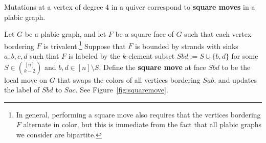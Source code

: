 Mutations at a vertex of degree 4 in a quiver correspond to \textbf{square moves} in a plabic graph.
\begin{defi}\label{definition:squaremove}
Let $G$ be a plabic graph, and let $F$ be a square face of $G$ such that each vertex bordering $F$ is trivalent.\footnote{In general, performing a square move also requires that the vertices bordering $F$ alternate in color, but this is immediate from the fact that all plabic graphs we consider are bipartite.} Suppose that $F$ is bounded by strands with sinks $a,b,c,d$ such that $F$ is labeled by the $k$-element subset $Sbd := S \cup \{b,d\}$ for some $S \in \binom{[n]}{k-2}$ and $b,d \in [n] \setminus S$. Define the \textbf{square move} at face $Sbd$ to be the local move on $G$ that swaps the colors of all vertices bordering $Sab$, and updates the label of $Sbd$ to $Sac$. See Figure~\ref{fig:squaremove}.
\begin{figure}
\centering
\begin{tikzpicture}[x=0.5pt,y=0.5pt,yscale=-1,xscale=1]


\end{tikzpicture}
\end{figure}
\end{defi}
